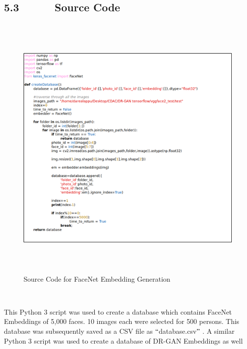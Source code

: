\documentclass[12pt]{article}
\renewcommand{\_}{\kern-1.5pt\textunderscore\kern-1.5pt}
\begin{document}
\subsection*{5.3\ \ \ \ \ \  Source Code}
\begin{Center}



\begin{figure}[H]
	\begin{Center}
		\includegraphics[width=5.8in,height=5.27in]{./media/image9.png}
		\caption{Source Code for FaceNet Embedding Generation}
		\label{fig:Source_Code_for_FaceNet_Embedding_Generation}
	\end{Center}
\end{figure}



\\

\end{Center}\par

\begin{justify}
This Python 3 script was used to create a database which contains FaceNet Embeddings of 5,000 faces. 10 images each were selected for 500 persons. This database was subsequently saved as a CSV file as $``$database.csv$"$ . A similar Python 3 script was used to create a database of DR-GAN Embeddings  \cite{tran2017disentangled}  as well
\end{justify}\par
\end{document}

